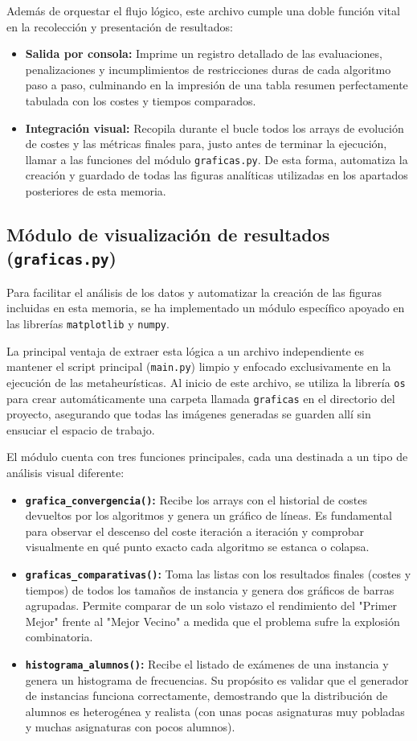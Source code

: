\documentclass[12pt]{article}
\begin{document}
Además de orquestar el flujo lógico, este archivo cumple una doble función vital en la recolección y presentación de resultados:
\begin{itemize}
    \item \textbf{Salida por consola:} Imprime un registro detallado de las evaluaciones, penalizaciones y incumplimientos de restricciones duras de cada algoritmo paso a paso, culminando en la impresión de una tabla resumen perfectamente tabulada con los costes y tiempos comparados.
    \item \textbf{Integración visual:} Recopila durante el bucle todos los arrays de evolución de costes y las métricas finales para, justo antes de terminar la ejecución, llamar a las funciones del módulo \texttt{graficas.py}. De esta forma, automatiza la creación y guardado de todas las figuras analíticas utilizadas en los apartados posteriores de esta memoria.
\end{itemize}

\subsection{Módulo de visualización de resultados (\texttt{graficas.py})}
Para facilitar el análisis de los datos y automatizar la creación de las figuras incluidas en esta memoria, se ha implementado un módulo específico apoyado en las librerías \texttt{matplotlib} y \texttt{numpy}.

La principal ventaja de extraer esta lógica a un archivo independiente es mantener el script principal (\texttt{main.py}) limpio y enfocado exclusivamente en la ejecución de las metaheurísticas. Al inicio de este archivo, se utiliza la librería \texttt{os} para crear automáticamente una carpeta llamada \texttt{graficas} en el directorio del proyecto, asegurando que todas las imágenes generadas se guarden allí sin ensuciar el espacio de trabajo.

El módulo cuenta con tres funciones principales, cada una destinada a un tipo de análisis visual diferente:
\begin{itemize}
    \item \textbf{\texttt{grafica\_convergencia()}:} Recibe los arrays con el historial de costes devueltos por los algoritmos y genera un gráfico de líneas. Es fundamental para observar el descenso del coste iteración a iteración y comprobar visualmente en qué punto exacto cada algoritmo se estanca o colapsa.
    \item \textbf{\texttt{graficas\_comparativas()}:} Toma las listas con los resultados finales (costes y tiempos) de todos los tamaños de instancia y genera dos gráficos de barras agrupadas. Permite comparar de un solo vistazo el rendimiento del "Primer Mejor" frente al "Mejor Vecino" a medida que el problema sufre la explosión combinatoria.
    \item \textbf{\texttt{histograma\_alumnos()}:} Recibe el listado de exámenes de una instancia y genera un histograma de frecuencias. Su propósito es validar que el generador de instancias funciona correctamente, demostrando que la distribución de alumnos es heterogénea y realista (con unas pocas asignaturas muy pobladas y muchas asignaturas con pocos alumnos).
\end{itemize}
\end{document}
